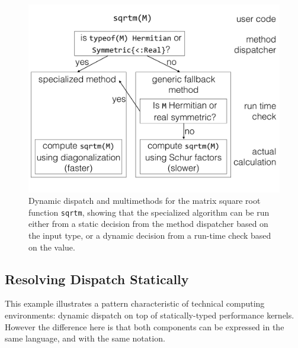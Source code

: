\begin{figure}
	\centering
	\includegraphics[width=\columnwidth]{fig-sqrtm}
	\caption{Dynamic dispatch and multimethods for the matrix square root
		function \texttt{sqrtm}, showing that the specialized algorithm
		can be run either from a static decision from the method
		dispatcher based on the input type, or a dynamic decision from
		a run-time check based on the value.}
	\label{fig:sqrtm}
\end{figure}

\subsection{Resolving Dispatch Statically}
This example illustrates a pattern characteristic of technical
computing environments: dynamic dispatch on top of statically-typed
performance kernels.
However the difference here is that both components can be expressed
in the same language, and with the same notation.


